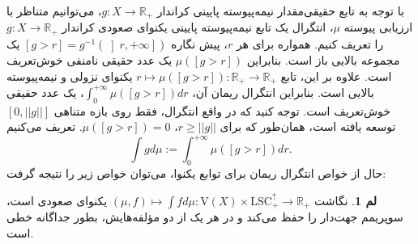 \documentclass[12pt,a4paper]{article}
\theoremstyle{definition}
\theoremstyle{theorem}
\newtheorem{lemma}[definition]{لم}
\theoremstyle{definition}
\newcommand{\bR}{\mathbb{R}}
\begin{document}
با توجه به تابع حقیقی‌مقدار نیمه‌پیوسته پایینی کراندار
$ g:X\rightarrow \mathbb{R}_{+} $، می‌توانیم متناظر با ارزیابی پیوسته 
$ \mu $، انتگرال یک تابع نیمه‌پیوسته پایینی یکنوای صعودی  کراندار 
\linebreak
$ g:X\rightarrow \mathbb{R}_{+} $
را تعریف کنیم. همواره برای هر 
$ r $،  پیش نگاره 
$ [g>r]=g^{-1}  (\left]  r,+ \infty \right] ) $
یک مجموعه بالایی باز است. بنابراین 
$ \mu([g>r]) $
یک عدد حقیقی نامنفی خوش‌تعریف است. علاوه بر این، تابع 
$  r\mapsto \mu([g>r]):\bR_{+}\rightarrow \bR_{+}$
یکنوای نزولی  و نیمه‌پیوسته بالایی است. بنابراین انتگرال ریمان آن، 
$ \int_{0}^{+\infty}{\mu([g>r])} dr $، یک عدد حقیقی خوش‌تعریف است.  توجه کنید که در واقع انتگرال،  فقط روی بازه متناهی 
$ [0,||g||] $
توسعه یافته است، همان‌طور که برای 
$ r\geq  ||g|| $،  
$ \mu([g>r])=0 $. تعریف می‌کنیم
$$ \int{g}d\mu :=\int_{0}^{+\infty}{\mu([g>r])} dr . $$
حال از خواص انتگرال ریمان برای توابع یکنوا، می‌توان خواص زیر را نتیجه گرفت:
\begin{lemma}\label{3.1}
نگاشت 
$ (\mu,f)\mapsto \int{f}d\mu :\mathrm{V}(X)\times \mathrm{LSC}_{+}^{\uparrow} \rightarrow \bR_{+}  $
یکنوای صعودی   است، سوپریمم جهت‌دار را حفظ می‌کند و در هر یک از دو مؤلفه‌هایش، بطور جداگانه خطی است.
\end{lemma}
\end{document}
